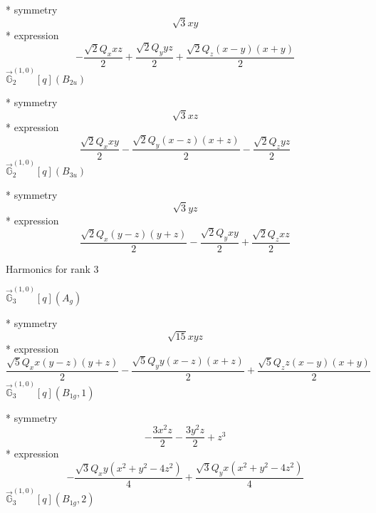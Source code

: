\documentclass[fleqn,8pt]{jsarticle}
\begin{document}
\noindent\quad ** symmetry
\begin{dmath*}
\sqrt{3} x y
\end{dmath*}
\noindent\quad ** expression
\begin{dmath*}
- \frac{\sqrt{2} Q_{x} x z}{2} + \frac{\sqrt{2} Q_{y} y z}{2} + \frac{\sqrt{2} Q_{z} \left(x - y\right) \left(x + y\right)}{2}
\end{dmath*}
\noindent\quad $\vec{\mathbb{G}}_{2}^{(1,0)}[q](B_{2u})$

\noindent\quad ** symmetry
\begin{dmath*}
\sqrt{3} x z
\end{dmath*}
\noindent\quad ** expression
\begin{dmath*}
\frac{\sqrt{2} Q_{x} x y}{2} - \frac{\sqrt{2} Q_{y} \left(x - z\right) \left(x + z\right)}{2} - \frac{\sqrt{2} Q_{z} y z}{2}
\end{dmath*}
\noindent\quad $\vec{\mathbb{G}}_{2}^{(1,0)}[q](B_{3u})$

\noindent\quad ** symmetry
\begin{dmath*}
\sqrt{3} y z
\end{dmath*}
\noindent\quad ** expression
\begin{dmath*}
\frac{\sqrt{2} Q_{x} \left(y - z\right) \left(y + z\right)}{2} - \frac{\sqrt{2} Q_{y} x y}{2} + \frac{\sqrt{2} Q_{z} x z}{2}
\end{dmath*}

\noindent * Harmonics for rank 3

\noindent\quad $\vec{\mathbb{G}}_{3}^{(1,0)}[q](A_{g})$

\noindent\quad ** symmetry
\begin{dmath*}
\sqrt{15} x y z
\end{dmath*}
\noindent\quad ** expression
\begin{dmath*}
\frac{\sqrt{5} Q_{x} x \left(y - z\right) \left(y + z\right)}{2} - \frac{\sqrt{5} Q_{y} y \left(x - z\right) \left(x + z\right)}{2} + \frac{\sqrt{5} Q_{z} z \left(x - y\right) \left(x + y\right)}{2}
\end{dmath*}
\noindent\quad $\vec{\mathbb{G}}_{3}^{(1,0)}[q](B_{1g},1)$

\noindent\quad ** symmetry
\begin{dmath*}
- \frac{3 x^{2} z}{2} - \frac{3 y^{2} z}{2} + z^{3}
\end{dmath*}
\noindent\quad ** expression
\begin{dmath*}
- \frac{\sqrt{3} Q_{x} y \left(x^{2} + y^{2} - 4 z^{2}\right)}{4} + \frac{\sqrt{3} Q_{y} x \left(x^{2} + y^{2} - 4 z^{2}\right)}{4}
\end{dmath*}
\noindent\quad $\vec{\mathbb{G}}_{3}^{(1,0)}[q](B_{1g},2)$
\end{document}
